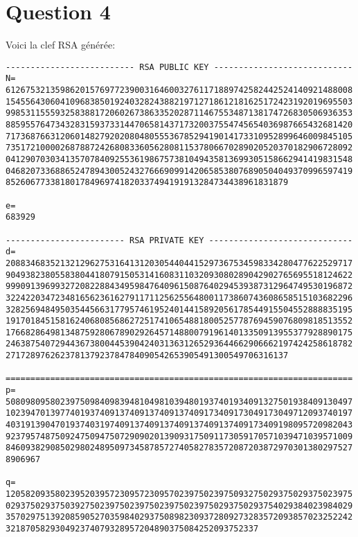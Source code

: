 \documentclass{article}
\begin{document}
\pagebreak
\section{Question 4}
Voici la clef RSA générée:
\hspace{1.5cm}
\begin{lstlisting}
-------------------------- RSA PUBLIC KEY ----------------------------
N=
6126753213598620157697723900316460032761171889742582442524140921488008
1545564306041096838501924032824388219712718612181625172423192019695503
9985311555932583881720602673863352028711467553487138174726830506936353
8859557647343283159373314470658143717320037554745654036987665432681420
7173687663120601482792020804805553678529419014173310952899646009845105
7351721000026878872426808336056280811537806670289020520370182906728092
0412907030341357078409255361986757381049435813699305158662941419831548
0468207336886524789430052432766690991420658538076890504049370996597419
852606773381801784969741820337494191913284734438961831879

e=
683929

------------------------ RSA PRIVATE KEY -----------------------------
d=
2088346835213212962753164131203054404415297367534598334280477622529717
9049382380558380441807915053141608311032093080289042902765695518124622
9990913969932720822884349598476409615087640294539387312964749530196872
3224220347234816562361627911711256255648001173860743608658515103682296
3282569484950354456631779574619524014415892056178544915504552888835195
1917018451581624068085686272517410654881800525778769459076809818513552
1766828649813487592806789029264571488007919614013350913955377928890175
2463875407294436738004453904240313631265293644662906662197424258618782
271728976262378137923784784090542653905491300549706316137

======================================================================
p=
5080980958023975098409839481049810394801937401934091327501938409130497
1023947013977401937409137409137409137409173409173049173049712093740197
4031913904701937403197409137409137409137409137409173409198095720982043
9237957487509247509475072909020139093175091173059170571039471039571009
8460938290850298024895097345878572740582783572087203872970301380297527
8906967

q=
1205820935802395203957230957230957023975023975093275029375029375023975
0293750293750392750239750239750239750239750293750293754029384023984029
3570297513920859052703598402937508982309372809273283572093857023252242
321870582930492374079328957204890375084252093752337
\end{lstlisting}
\end{document}
